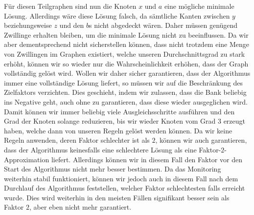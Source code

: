 \documentclass[12pt,onecolumn, notitlepage]{scrartcl}
\begin{document}
\begin{center}
\end{center}

Für diesen Teilgraphen sind nun die Knoten $x$ und $a$ eine mögliche minimale Lösung. Allerdings wäre diese Lösung falsch, da sämtliche Kanten zwischen $y$ beziehungsweise $z$ und den $b$s nicht abgedeckt wären. Daher müssen genügend Zwillinge erhalten bleiben, um die minimale Lösung nicht zu beeinflussen.\newline
Da wir aber dementsprechend nicht sicherstellen können, dass nicht trotzdem eine Menge von Zwillingen im Graphen existiert, welche unseren Durchschnittsgrad zu stark erhöht, können wir so wieder nur die Wahrscheinlichkeit erhöhen, dass der Graph vollständig gelöst wird. \newline
Wollen wir daher sicher garantieren, dass der Algorithmus immer eine vollständige Lösung liefert, so müssen wir auf die Beschränkung des Zielfaktors verzichten. Dies geschieht, indem wir zulassen, dass die Bank beliebig ins Negative geht, auch ohne zu garantieren, dass diese wieder ausgeglichen wird. Damit können wir immer beliebig viele Ausgleichsschritte ausführen und den Grad der Knoten solange reduzieren, bis wir wieder Knoten vom Grad $3$ erzeugt haben, welche dann von unseren Regeln gelöst werden können. Da wir keine Regeln anwenden, deren Faktor schlechter ist als $2$, können wir auch garantieren, dass der Algorithmus keinesfalls eine schlechtere Lösung als eine Faktor-$2$-Approximation liefert. Allerdings können wir in diesem Fall den Faktor vor den Start des Algorithmus nicht mehr besser bestimmen.\newline
Da das Monitoring weiterhin stabil funktioniert, können wir jedoch auch in diesem Fall nach dem Durchlauf des Algorithmus feststellen, welcher Faktor schlechtesten falls erreicht wurde. Dies wird weiterhin in den meisten Fällen signifikant besser sein als Faktor $2$, aber eben nicht mehr garantiert.\newline\newline
\end{document}
